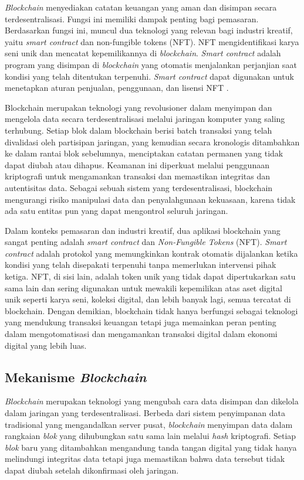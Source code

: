 \emph{Blockchain} menyediakan catatan keuangan yang aman dan disimpan secara terdesentralisasi. Fungsi ini memiliki dampak penting bagi pemasaran. Berdasarkan fungsi ini, muncul dua teknologi yang relevan bagi industri kreatif, yaitu \emph{smart contract} dan non-fungible tokens (NFT). NFT mengidentifikasi karya seni unik dan mencatat kepemilikannya di \emph{blockchain}. \emph{Smart contract} adalah program yang disimpan di \emph{blockchain} yang otomatis menjalankan perjanjian saat kondisi yang telah ditentukan terpenuhi. \emph{Smart contract} dapat digunakan untuk menetapkan aturan penjualan, penggunaan, dan lisensi NFT \cite{Malik2023}.

Blockchain merupakan teknologi yang revolusioner dalam menyimpan dan mengelola data secara terdesentralisasi melalui jaringan komputer yang saling terhubung. Setiap blok dalam blockchain berisi batch transaksi yang telah divalidasi oleh partisipan jaringan, yang kemudian secara kronologis ditambahkan ke dalam rantai blok sebelumnya, menciptakan catatan permanen yang tidak dapat diubah atau dihapus. Keamanan ini diperkuat melalui penggunaan kriptografi untuk mengamankan transaksi dan memastikan integritas dan autentisitas data. Sebagai sebuah sistem yang terdesentralisasi, blockchain mengurangi risiko manipulasi data dan penyalahgunaan kekuasaan, karena tidak ada satu entitas pun yang dapat mengontrol seluruh jaringan.

Dalam konteks pemasaran dan industri kreatif, dua aplikasi blockchain yang sangat penting adalah \emph{smart contract} dan \emph{Non-Fungible Tokens} (NFT). \emph{Smart contract} adalah protokol yang memungkinkan kontrak otomatis dijalankan ketika kondisi yang telah disepakati terpenuhi tanpa memerlukan intervensi pihak ketiga. NFT, di sisi lain, adalah token unik yang tidak dapat dipertukarkan satu sama lain dan sering digunakan untuk mewakili kepemilikan atas aset digital unik seperti karya seni, koleksi digital, dan lebih banyak lagi, semua tercatat di blockchain. Dengan demikian, blockchain tidak hanya berfungsi sebagai teknologi yang mendukung transaksi keuangan tetapi juga memainkan peran penting dalam mengotomatisasi dan mengamankan transaksi digital dalam ekonomi digital yang lebih luas.

\subsection{Mekanisme \emph{Blockchain}}
\emph{Blockchain} merupakan teknologi yang mengubah cara data disimpan dan dikelola dalam jaringan yang terdesentralisasi. Berbeda dari sistem penyimpanan data tradisional yang mengandalkan server pusat, \emph{blockchain} menyimpan data dalam rangkaian \emph{blok} yang dihubungkan satu sama lain melalui \emph{hash} kriptografi. Setiap \emph{blok} baru yang ditambahkan mengandung tanda tangan digital yang tidak hanya melindungi integritas data tetapi juga memastikan bahwa data tersebut tidak dapat diubah setelah dikonfirmasi oleh jaringan.

